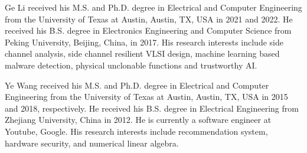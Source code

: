 \documentclass[9.5pt,journal,compsoc]{IEEEtran}
\begin{document}
\begin{IEEEbiography}%
{Ge Li}
received his M.S. and Ph.D. degree in Electrical and Computer Engineering from the University of Texas at Austin, Austin, TX, USA in 2021 and 2022. He received his B.S. degree in Electronics Engineering and Computer Science from Peking University, Beijing, China, in 2017. His research interests include side channel analysis, side channel resilient VLSI design, machine learning based malware detection, physical unclonable functions and trustworthy AI.
\end{IEEEbiography}

\begin{IEEEbiography}%
{Ye Wang}
received his M.S. and Ph.D. degree in Electrical and Computer Engineering from the University of Texas at Austin, Austin, TX, USA in 2015 and 2018, respectively. 
He received his B.S. degree in Electrical Engineering from Zhejiang University, China in 2012.
He is currently a software engineer at Youtube, Google. 
His research interests include recommendation system, hardware security, and numerical linear algebra.
\end{IEEEbiography}
\end{document}
